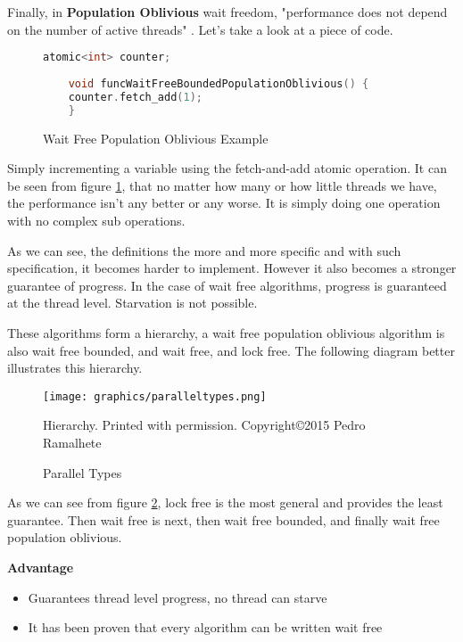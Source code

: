 \documentclass[letterpaper, 12pt]{article}
\begin{document}
\par\vspace{\baselineskip}
Finally, in {\bfseries Population Oblivious} wait freedom, "performance does not depend on the 
number of active threads" \citep[p. 59]{artofmulti}. Let's take a look at a piece of code. 



\begin{figure}
	\begin{lstlisting}[language=C++]
	atomic<int> counter;
	
	void funcWaitFreeBoundedPopulationOblivious() {
	counter.fetch_add(1);
	}
	\end{lstlisting} 
	\citep{concurrencyfreaks}
	\caption{Wait Free Population Oblivious Example} \label{wfpo_ex}
\end{figure}

Simply incrementing a variable using the fetch-and-add atomic operation. It can be seen from figure \ref{wfpo_ex}, that no 
matter how many or how little threads we have, the performance isn't any better or any worse. 
It is simply doing one operation with no complex sub operations.

\par\vspace{\baselineskip}

As we can see, the definitions the more and more specific and with such specification, it becomes 
harder to implement. However it also becomes a stronger guarantee of progress. In the case of 
wait free algorithms, progress is guaranteed at the thread level. Starvation is not possible.

These algorithms form a hierarchy, a wait free population oblivious algorithm is also wait 
free bounded, and wait free, and lock free. The following diagram better illustrates 
this hierarchy.

\begin{figure}
    \centering
	\texttt{[image: graphics/paralleltypes.png]}
	\caption{Hierarchy. Printed with permission. Copyright\copyright 2015 Pedro Ramalhete}
	\citep{concurrencyfreaks} \caption{Parallel Types} \label{paralleltypes}
\end{figure}


As we can see from figure \ref{paralleltypes}, lock free is the most general and provides the least guarantee. Then 
wait free is next, then wait free bounded, and finally wait free population oblivious.


{\bfseries Advantage}
\par\vspace{\baselineskip}
\begin{itemize}

	\item Guarantees thread level progress, no thread can starve
	\item It has been proven that every algorithm can be written wait free
\end{itemize}
\end{document}
